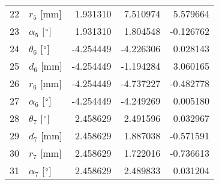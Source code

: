 \documentclass{standalone}%
\begin{document}
\begin{tabular}{llrrr}
22 &              $r_{5}$ [mm] &  1.931310 &   7.510974 &   5.579664 \\
23 &  $\alpha_{5}$ [$\degree$] &  1.931310 &   1.804548 &  -0.126762 \\
24 &  $\theta_{6}$ [$\degree$] & -4.254449 &  -4.226306 &   0.028143 \\
25 &              $d_{6}$ [mm] & -4.254449 &  -1.194284 &   3.060165 \\
26 &              $r_{6}$ [mm] & -4.254449 &  -4.737227 &  -0.482778 \\
27 &  $\alpha_{6}$ [$\degree$] & -4.254449 &  -4.249269 &   0.005180 \\
28 &  $\theta_{7}$ [$\degree$] &  2.458629 &   2.491596 &   0.032967 \\
29 &              $d_{7}$ [mm] &  2.458629 &   1.887038 &  -0.571591 \\
30 &              $r_{7}$ [mm] &  2.458629 &   1.722016 &  -0.736613 \\
31 &  $\alpha_{7}$ [$\degree$] &  2.458629 &   2.489833 &   0.031204 \\
\bottomrule
\end{tabular}
%
\end{document}
